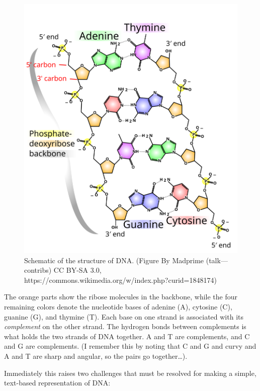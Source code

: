 \documentclass[]{krantz}
\begin{document}
\begin{figure}

{\centering \includegraphics{figs/DNA_chemical_structure} 

}

\caption{Schematic of the structure of DNA. (Figure By Madprime (talk---contribs)  CC BY-SA 3.0, https://commons.wikimedia.org/w/index.php?curid=1848174)}\label{fig:dna-structure}
\end{figure}

The orange parts show the ribose molecules in the backbone, while the four remaining colors
denote the nucleotide bases of adenine (A), cytosine (C), guanine (G), and thymine (T). Each base
on one strand is associated with its \emph{complement} on the other strand. The hydrogen bonds between
complements is what holds the two strands of DNA together. A and T are complements, and
C and G are complements. (I remember this by noting that C and G and curvy and A and T are sharp and
angular, so the pairs go together\ldots{}).

Immediately this raises two challenges that must be resolved for making a simple,
text-based representation of DNA:
\end{document}
